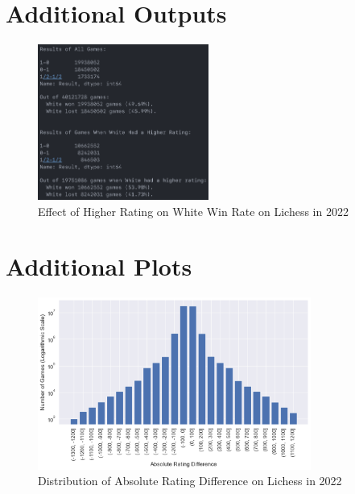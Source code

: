 \documentclass[a4paper, 11pt]{article}
\begin{document}
\newpage
\begin{appendices}

\section{Additional Outputs}
\begin{figure}[H]
    \centering
    \caption{Effect of Higher Rating on White Win Rate on Lichess in 2022}
    \label{fig:effectOfHigherRatingOnWhiteWinRate}
    \includegraphics[width=0.5\textwidth]{Effect of Higher Rating on White Win Rate.png}
\end{figure}

\section{Additional Plots}
\begin{figure}[H]
    \centering
    \caption{Distribution of Absolute Rating Difference on Lichess in 2022}
    \label{fig:distributionOfAbsoluteRatingDifference}
    \includegraphics[width=0.8\textwidth]{Distribution of Absolute Rating Difference.png}
\end{figure}


\end{appendices}
\end{document}
